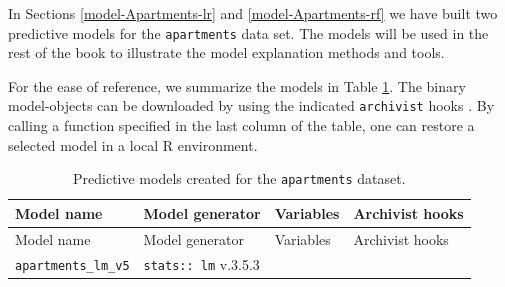 \documentclass[12pt,]{krantz}
\begin{document}
In Sections \ref{model-Apartments-lr} and \ref{model-Apartments-rf} we have built two predictive models for the \texttt{apartments} data set. The models will be used in the rest of the book to illustrate the model explanation methods and tools.

For the ease of reference, we summarize the models in Table \ref{tab:archivistHooksOfModelsApartments}. The binary model-objects can be downloaded by using the indicated \texttt{archivist} hooks \citep{archivist}. By calling a function specified in the last column of the table, one can restore a selected model in a local R environment.

\begin{longtable}[]{@{}llll@{}}
\caption{\label{tab:archivistHooksOfModelsApartments} Predictive models created for the \texttt{apartments} dataset.}\tabularnewline
\toprule
\begin{minipage}[b]{0.21\columnwidth}\raggedright
Model name\strut
\end{minipage} & \begin{minipage}[b]{0.25\columnwidth}\raggedright
Model generator\strut
\end{minipage} & \begin{minipage}[b]{0.18\columnwidth}\raggedright
Variables\strut
\end{minipage} & \begin{minipage}[b]{0.25\columnwidth}\raggedright
Archivist hooks\strut
\end{minipage}\tabularnewline
\midrule
\endfirsthead
\toprule
\begin{minipage}[b]{0.21\columnwidth}\raggedright
Model name\strut
\end{minipage} & \begin{minipage}[b]{0.25\columnwidth}\raggedright
Model generator\strut
\end{minipage} & \begin{minipage}[b]{0.18\columnwidth}\raggedright
Variables\strut
\end{minipage} & \begin{minipage}[b]{0.25\columnwidth}\raggedright
Archivist hooks\strut
\end{minipage}\tabularnewline
\midrule
\endhead
\begin{minipage}[t]{0.21\columnwidth}\raggedright
\texttt{apartments\_lm\_v5}\strut
\end{minipage} & \begin{minipage}[t]{0.25\columnwidth}\raggedright
\texttt{stats::\ lm} v.3.5.3\strut
\end{minipage} & \begin{minipage}[t]{0.18\columnwidth}\raggedright

\end{minipage}
\end{longtable}
\end{document}
